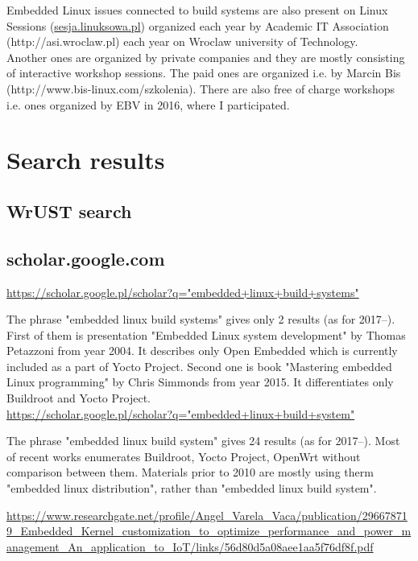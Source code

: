 \documentclass[printmode]{mgr}
\begin{document}
Embedded Linux issues connected to build systems are also present on Linux Sessions (\url{sesja.linuksowa.pl}) organized each year by Academic IT Association (http://asi.wroclaw.pl) each year on Wroclaw university of Technology. \\

Another ones are organized by private companies and they are mostly consisting of interactive workshop sessions. The paid ones are organized i.e. by Marcin Bis (http://www.bis-linux.com/szkolenia). There are also free of charge workshops i.e. ones organized by EBV in 2016, where I participated.

\section{Search results}

\subsection{WrUST search}

\subsection{scholar.google.com}

\url{https://scholar.google.pl/scholar?q="embedded+linux+build+systems"}

The phrase "embedded linux build systems" gives only 2 results (as for 2017--). First of them is presentation "Embedded Linux system development" by Thomas Petazzoni from year 2004. It describes only Open Embedded which is currently included as a part of Yocto Project. Second one is book "Mastering embedded Linux programming" by Chris Simmonds from year 2015. It differentiates only Buildroot and Yocto Project. \\

\url{https://scholar.google.pl/scholar?q="embedded+linux+build+system"}

The phrase "embedded linux build system" gives 24 results (as for 2017--). Most of recent works enumerates Buildroot, Yocto Project, OpenWrt without comparison between them. Materials prior to 2010 are mostly using therm "embedded linux distribution", rather than "embedded linux build system".

\url{https://www.researchgate.net/profile/Angel_Varela_Vaca/publication/296678719_Embedded_Kernel_customization_to_optimize_performance_and_power_management_An_application_to_IoT/links/56d80d5a08aee1aa5f76df8f.pdf}
\end{document}
